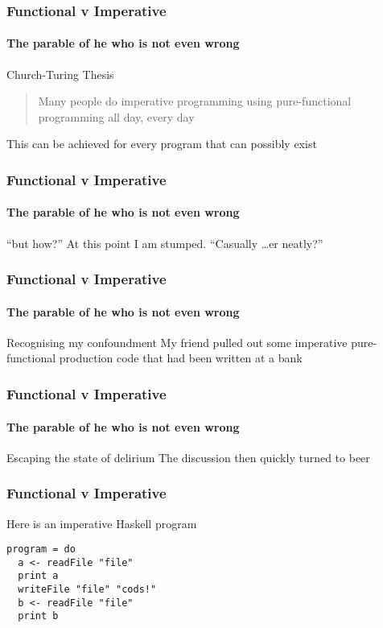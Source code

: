 {\begin{frame}
\frametitle{Functional v Imperative}
\framesubtitle{The parable of he who is not even wrong}
\begin{block}{Church-Turing Thesis}
\begin{quote}
Many people do imperative programming using pure-functional programming all day, every day
\end{quote}
This can be achieved for every program that can possibly exist
\end{block}
\end{frame}


\begin{frame}
\frametitle{Functional v Imperative}
\framesubtitle{The parable of he who is not even wrong}
\begin{block}{``but how?''}
At this point I am stumped. ``Casually \ldots er neatly?''
\end{block}
\end{frame}


\begin{frame}
\frametitle{Functional v Imperative}
\framesubtitle{The parable of he who is not even wrong}
\begin{block}{Recognising my confoundment}
My friend pulled out some imperative pure-functional production code that had been written at a bank
\end{block}
\end{frame}


\begin{frame}
\frametitle{Functional v Imperative}
\framesubtitle{The parable of he who is not even wrong}
\begin{block}{Escaping the state of delirium}
The discussion then quickly turned to beer
\end{block}
\end{frame}
}


\begin{frame}[fragile]
\frametitle{Functional v Imperative}
\begin{block}{Here is an imperative Haskell program}
\begin{lstlisting}[style=haskell,mathescape]
program = do
  a <- readFile "file"
  print a
  writeFile "file" "cods!"
  b <- readFile "file"
  print b
\end{lstlisting}
\end{block}
\end{frame}


